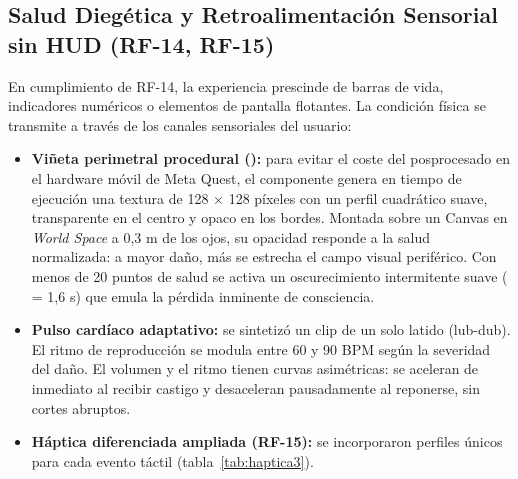 \subsection{Salud Diegética y Retroalimentación Sensorial sin HUD (RF-14, RF-15)}
En cumplimiento de RF-14, la experiencia prescinde de barras de vida, indicadores numéricos o elementos de pantalla flotantes. La condición física se transmite a través de los canales sensoriales del usuario:
\begin{itemize}
  \item \textbf{Viñeta perimetral procedural ():} para evitar el coste del posprocesado en el hardware móvil de Meta Quest, el componente genera en tiempo de ejecución una textura de 128 $\times$ 128 píxeles con un perfil cuadrático suave, transparente en el centro y opaco en los bordes. Montada sobre un Canvas en \emph{World Space} a 0,3 m de los ojos, su opacidad responde a la salud normalizada: a mayor daño, más se estrecha el campo visual periférico. Con menos de 20 puntos de salud se activa un oscurecimiento intermitente suave ( = 1,6 s) que emula la pérdida inminente de consciencia.
  \item \textbf{Pulso cardíaco adaptativo:} se sintetizó un clip de un solo latido (lub-dub). El ritmo de reproducción se modula entre 60 y 90 BPM según la severidad del daño. El volumen y el ritmo tienen curvas asimétricas: se aceleran de inmediato al recibir castigo y desaceleran pausadamente al reponerse, sin cortes abruptos.
  \item \textbf{Háptica diferenciada ampliada (RF-15):} se incorporaron perfiles únicos para cada evento táctil (tabla~\ref{tab:haptica3}).
\end{itemize}

\begin{table}[H]
\centering
\caption{Patrones de vibración del Entregable 3.}
\label{tab:haptica3}
\end{table}

